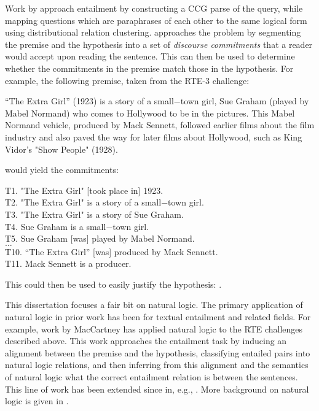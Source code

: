 Work by 
  approach entailment by constructing a CCG parse of the query,
  while mapping questions which are paraphrases of each other to the
  same logical form using distributional relation clustering.
 approaches the problem by segmenting the premise and
  the hypothesis into a set of \textit{discourse commitments} that a reader would
  accept upon reading the sentence.
This can then be used to determine whether the commitments in the premise match those in
  the hypothesis.
For example, the following premise, taken from the RTE-3 challenge:

\begin{displayquote}
``The Extra Girl'' (1923) is a story of a small−town girl, Sue Graham (played by Mabel Normand) who comes to
  Hollywood to be in the pictures. 
This Mabel Normand vehicle, produced by Mack Sennett, followed earlier
  films about the film industry and also paved the way for later films about Hollywood, such as King Vidor’s
  "Show People" (1928).
\end{displayquote}

would yield the commitments:

\begin{displayquote}
T1. "The Extra Girl" [took place in] 1923. \\
T2. "The Extra Girl" is a story of a small−town girl. \\
T3. "The Extra Girl" is a story of Sue Graham. \\
T4. Sue Graham is a small−town girl. \\
T5. Sue Graham [was] played by Mabel Normand. \\
$\dots$ \\
T10. ``The Extra Girl'' [was] produced by Mack Sennett. \\
T11. Mack Sennett is a producer.
\end{displayquote}

This could then be used to easily justify the hypothesis:
  .


This dissertation focuses a fair bit on natural logic.
The primary application of natural logic in prior work has been
  for textual entailment and related fields.
For example, work by MacCartney 
  \cite{key:2007maccartney-natlog,key:2008maccartney-natlog,key:2009maccartney-natlog,key:2009maccartney-natlog}
  has applied natural logic to the RTE challenges described above.
This work approaches the entailment task by inducing an alignment between the premise and the
  hypothesis, classifying entailed pairs into natural logic relations, and then inferring
  from this alignment and the semantics of natural logic what the correct entailment
  relation is between the sentences.
This line of work has been extended since in, e.g., .
More background on natural logic is given in .


